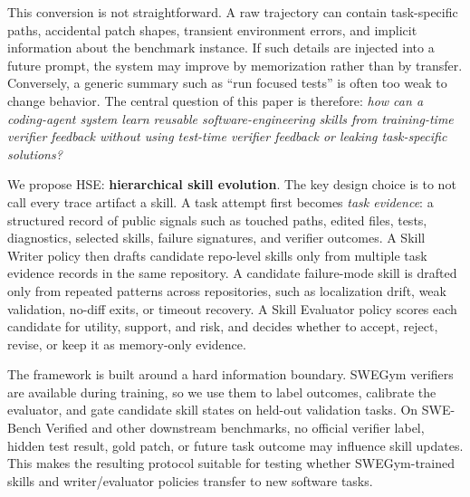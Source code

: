 \documentclass{article}
\newcommand{\method}{HSE}
\begin{document}
This conversion is not straightforward. A raw trajectory can contain
task-specific paths, accidental patch shapes, transient environment errors, and
implicit information about the benchmark instance. If such details are injected
into a future prompt, the system may improve by memorization rather than by
transfer. Conversely, a generic summary such as ``run focused tests'' is often
too weak to change behavior. The central question of this paper is therefore:
\emph{how can a coding-agent system learn reusable software-engineering skills
from training-time verifier feedback without using test-time verifier feedback
or leaking task-specific solutions?}

We propose \method{}: \textbf{hierarchical skill evolution}. The key design
choice is to not call every trace artifact a skill. A task attempt first becomes
\emph{task evidence}: a structured record of public signals such as touched
paths, edited files, tests, diagnostics, selected skills, failure signatures,
and verifier outcomes. A Skill Writer policy then drafts candidate repo-level
skills only from multiple task evidence records in the same repository. A
candidate failure-mode skill is drafted only from repeated patterns across
repositories, such as localization drift, weak validation, no-diff exits, or
timeout recovery. A Skill Evaluator policy scores each candidate for utility,
support, and risk, and decides whether to accept, reject, revise, or keep it as
memory-only evidence.

The framework is built around a hard information boundary. SWEGym verifiers are
available during training, so we use them to label outcomes, calibrate the
evaluator, and gate candidate skill states on held-out validation tasks. On
SWE-Bench Verified and other downstream benchmarks, no official verifier label,
hidden test result, gold patch, or future task outcome may influence skill
updates. This makes the resulting protocol suitable for testing whether
SWEGym-trained skills and writer/evaluator policies transfer to new software
tasks.
\end{document}
